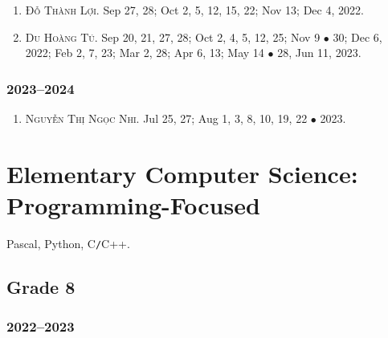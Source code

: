 \documentclass{article}
\begin{document}
\begin{enumerate}
	\item \textsc{Đỗ Thành Lợi.} {\sf[In]} Sep 27, 28; Oct 2, 5, 12, 15, 22; Nov 13; Dec 4, 2022. {\sf[Out]}
	\item \textsc{Du Hoàng Tú.} {\sf[In]} Sep 20, 21, 27, 28; Oct 2, 4, 5, 12, 25; Nov 9 $\bullet$ 30; Dec 6, 2022; Feb 2, 7, 23; Mar 2, 28; Apr 6, 13; May 14 $\bullet$ 28, Jun 11, 2023. {\sf[Out]}
\end{enumerate}

\subsubsection{2023--2024}

\begin{enumerate}
	\item \textsc{Nguyễn Thị Ngọc Nhi.} {\sf[In]} Jul 25, 27; Aug 1, 3, 8, 10, 19, 22 $\bullet$ 2023. {\sf[Out]}
\end{enumerate}


\section{Elementary Computer Science: Programming-Focused}
Pascal, Python, C\texttt{/}C++.

\subsection{Grade 8}

\subsubsection{2022--2023}
\end{document}
